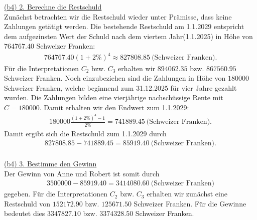 \underline{(b4) 2. Berechne die Restschuld}\\
Zunächst betrachten wir die Restschuld wieder unter Prämisse, dass keine Zahlungen getätigt werden. Die bestehende Restschuld am 1.1.2029 entspricht dem aufgezinsten Wert der Schuld nach dem viertem Jahr(1.1.2025) in Höhe von $764767.40$ Schweizer Franken:
\begin{align*}
	764767.40(1+ 2 \%)^4
	\approx
	827808.85\ \textrm{(Schweizer Franken)}.
\end{align*} 
Für die Interpretationen $C_2$ bzw. $C_3$ erhalten wir $894062.35$ bzw. $867560.95$ Schweizer Franken. 
Noch einzubeziehen sind die Zahlungen in Höhe von $180 000$ Schweizer Franken, welche beginnend zum 31.12.2025 für vier Jahre gezahlt wurden.
Die Zahlungen bilden eine vierjährige nachschüssige Rente mit $C = 180 000$. Damit erhalten wir den Endwert zum 1.1.2029:
\begin{align*}
	180 000
	\frac{(1+ 2 \%)^4 -1 }{2 \%}
	 = 
	 741 889.45 \ \textrm{(Schweizer Franken)}.
\end{align*}
Damit ergibt sich die Restschuld zum 1.1.2029 durch
\begin{align*}
	827 808.85 
	-
	741 889.45
	=
	85919.40  \ \textrm{(Schweizer Franken)}.
\end{align*}
\ \\
\underline{(b4) 3. Bestimme den Gewinn}\\
Der Gewinn von Anne und Robert ist somit durch
\begin{align*}
	3500 000 - 85919.40 = 3414080.60 \ \textrm{(Schweizer Franken)}
\end{align*}
gegeben.
Für die Interpretationen $C_2$ bzw. $C_3$ erhalten wir zunächst eine Restschuld von $152172.90$ bzw. $125671.50$ Schweizer Franken. Für die Gewinne bedeutet dies $3347827.10$ bzw. $3374328.50$ Schweizer Franken.

\newpage
